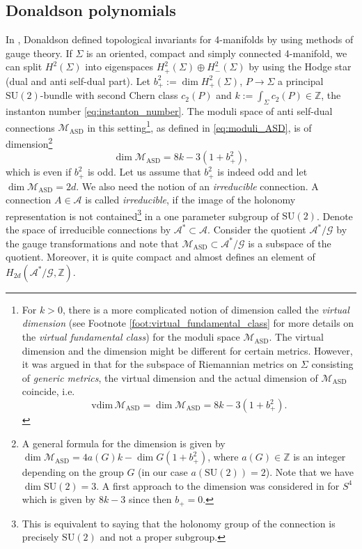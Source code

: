 \documentclass[11pt,colorinlistoftodos]{amsart}
\numberwithin{equation}{subsection}
\theoremstyle{plain}
\theoremstyle{definition}
\theoremstyle{remark}
\newcommand{\Z}{\mathbb{Z}}
\newcommand{\calM}{\mathcal{M}}
\begin{document}
\subsection{Donaldson polynomials}\label{subsec:Donaldson_polynomials}
In \cite{Donaldson1983}, Donaldson defined topological invariants for 4-manifolds by using methods of gauge theory. If $\Sigma$ is an oriented, compact and simply connected 4-manifold, we can split $H^2(\Sigma)$ into eigenspaces $H^2_+(\Sigma)\oplus H^2_-(\Sigma)$ by using the Hodge star (dual and anti self-dual part). Let $b^2_+:=\dim H^2_+(\Sigma)$, $P\to \Sigma$ a principal $\mathrm{SU}(2)$-bundle with second Chern class $c_2(P)$ and $k:=\int_\Sigma c_2(P)\in \mathbb{Z}$, the instanton number \eqref{eq:instanton_number}. The moduli space of anti self-dual connections $\calM_{\mathrm{ASD}}$ in this setting\footnote{For $k>0$, there is a more complicated notion of dimension called the \emph{virtual dimension} (see Footnote \ref{foot:virtual_fundamental_class} for more details on the \emph{virtual fundamental class}) for the moduli space $\calM_\mathrm{ASD}$. The virtual dimension and the dimension might be different for certain metrics. However, it was argued in \cite{FreedUhlenbeck1984} that for the subspace of Riemannian metrics on $\Sigma$ consisting of \emph{generic metrics}, the virtual dimension and the actual dimension of $\calM_\mathrm{ASD}$ coincide, i.e. \[\mathrm{vdim}\,\calM_\mathrm{ASD}=\dim\calM_\mathrm{ASD}=8k-3(1+b_+^2).\]}, as defined in \eqref{eq:moduli_ASD}, is of dimension\footnote{A general formula for the dimension is given by $\dim \calM_\mathrm{ASD}=4a(G)k-\dim G(1+b_+^2)$, where $a(G)\in\Z$ is an integer depending on the group $G$ (in our case $a(\mathrm{SU}(2))=2$). Note that we have $\dim \mathrm{SU}(2)=3$. A first approach to the dimension was considered in \cite{AtiyahHitchinSinger1977,AtiyahHitchinSinger1978} for $S^4$ which is given by $8k-3$ since then $b_+=0$.} 
\begin{equation}
\label{eq:dimension_moduli}
\dim \calM_{\mathrm{ASD}}=8k-3(1+b_+^2),
\end{equation}
which is even if $b_+^2$ is odd. Let us assume that $b_+^2$ is indeed odd and let $\dim \calM_\mathrm{ASD}=2d$. We also need the notion of an \emph{irreducible} connection. A connection $A\in \mathcal{A}$ is called \emph{irreducible}, if the image of the holonomy representation is not contained\footnote{This is equivalent to saying that the holonomy group of the connection is precisely $\mathrm{SU}(2)$ and not a proper subgroup.} in a one parameter subgroup of $\mathrm{SU}(2)$. Denote the space of irreducible connections by $\mathcal{A}^*\subset \mathcal{A}$. Consider the quotient $\mathcal{A}^*/\mathcal{G}$ by the gauge transformations and note that $\calM_{\mathrm{ASD}}\subset \mathcal{A}^*/\mathcal{G}$ is a subspace of the quotient. Moreover, it is quite compact and almost defines an element of $H_{2d}(\mathcal{A}^*/\mathcal{G},\mathbb{Z})$. 
\end{document}
